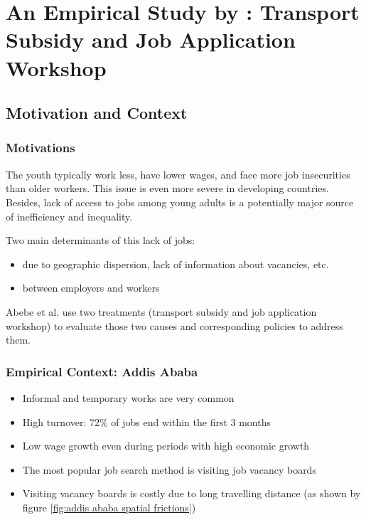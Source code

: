 \section{An Empirical Study by \cite{abebe_anonymity_2021}: Transport Subsidy and Job Application Workshop}

    \subsection{Motivation and Context}
    
        \subsubsection{Motivations}
            The youth typically work less, have lower wages, and face more job insecurities than older workers. This issue is even more severe in developing countries. Besides, lack of access to jobs among young adults is a potentially major source of inefficiency and inequality.\par
            Two main determinants of this lack of jobs:
            \begin{itemize}
                \item {} due to geographic dispersion, lack of information about vacancies, etc.
                \item {} between employers and workers
            \end{itemize}\par
            Abebe et al. use two treatments (transport subsidy and job application workshop) to evaluate those two causes and corresponding policies to address them.
            
        \subsubsection{Empirical Context: Addis Ababa}
             \begin{itemize}
                 \item Informal and temporary works are very common
                 \item High turnover: 72\% of jobs end within the first 3 months
                 \item Low wage growth even during periods with high economic growth
                 \item The most popular job search method is visiting job vacancy boards
                 \item Visiting vacancy boards is costly due to long travelling distance (as shown by figure \ref{fig:addis ababa spatial frictions})
             \end{itemize}
        
